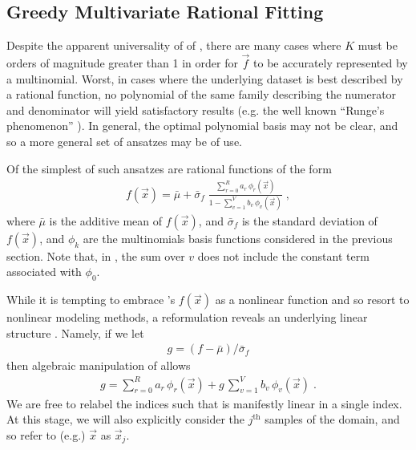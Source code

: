\documentclass[twocolumn,aps,prd,floatfix,preprintnumbers,a4paper,nofootinbib,
superscriptaddress,10pt]{revtex4-1}
\begin{document}
\subsection{Greedy Multivariate Rational Fitting}
%
%
\par Despite the apparent universality of of , there are many cases where $K$ must be orders of magnitude greater than 1 in order for $\vec{f}$ to be accurately represented by a multinomial.
%
Worst, in cases where the underlying dataset is best described by a rational function, no polynomial of the same family describing the numerator and denominator will yield satisfactory results (e.g. the well known ``Runge's phenomenon'' \cite{10.2307/2323093}).
%
In general, the optimal polynomial basis may not be clear, and so a more general set of ansatzes may be of use.
%
\par Of the simplest of such ansatzes are rational functions of the form
%
\def\muf{\bar{\mu}}
\def\sif{\bar{\sigma}_f}
\begin{align}
  \label{eq:rat1}
  f(\vec{x}) = \muf + \sif \; \frac{ \sum_{r=0}^{R} a_r \, \phi_{r}(\vec{x}) }{ 1 - \sum_{v=1}^{V} b_v \, \phi_{v}(\vec{x}) } \;,
\end{align}
%
where $\muf$ is the additive mean of $f(\vec{x})$, and $\sif$ is the standard deviation of $f(\vec{x})$, and $\phi_k$ are the multinomials basis functions considered in the previous section.
%
Note that, in , the sum over $v$ does not include the constant term associated with $\phi_0$.
%
\par While it is tempting to embrace 's $f({\vec{x}})$ as a nonlinear function and so resort to nonlinear modeling methods, a reformulation reveals an underlying linear structure \cite{Press:1992:NRC:148286}.
%
Namely, if we let
%
\begin{align}
  g = (f - \muf)/\sif
\end{align}
%
then algebraic manipulation of  allows
%
\begin{align}
  \label{eq:rat2}
  g = \sum_{r=0}^{R} a_r \, \phi_{r}(\vec{x}) + g\, \sum_{v=1}^{V} b_v \, \phi_{v}(\vec{x}) \; .
\end{align}
%
We are free to relabel the indices such that  is manifestly linear in a single index.
%
At this stage, we will also explicitly consider the $j^\mathrm{th}$ samples of the domain, and so refer to (e.g.) $\vec{x}$ as $\vec{x}_j$.
%
%
\end{document}
